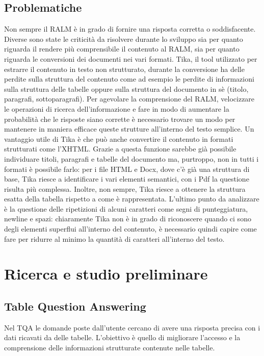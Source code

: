\subsection{Problematiche}
Non sempre il RALM è in grado di fornire una risposta corretta o soddisfacente.
Diverse sono state le criticità da risolvere durante lo sviluppo sia per quanto riguarda il rendere più comprensibile il contenuto al RALM, sia per quanto riguarda le conversioni dei documenti nei vari formati.
Tika, il tool utilizzato per estrarre il contenuto in testo non strutturato, durante la conversione ha delle perdite sulla struttura del contenuto come ad esempio le perdite di informazioni sulla struttura delle tabelle oppure sulla struttura del documento in sè (titolo, paragrafi, sottoparagrafi).
Per agevolare la comprensione del RALM, velocizzare le operazioni di ricerca dell'informazione e fare in modo di aumentare la probabilità che le risposte siano corrette è necessario trovare un modo per mantenere in maniera efficace queste strutture all'interno del testo semplice.
Un vantaggio utile di Tika è che può anche convertire il contenuto in formati strutturati come l'XHTML.
Grazie a questa funzione sarebbe già possibile individuare titoli, paragrafi e tabelle del documento ma, purtroppo, non in tutti i formati è possibile farlo: per i file HTML e Docx, dove c'è già una struttura di base, Tika riesce a identificare i vari elementi semantici, con i Pdf la questione risulta più complessa.
Inoltre, non sempre, Tika riesce a ottenere la struttura esatta della tabella rispetto a come è rappresentata.
L'ultimo punto da analizzare è la questione delle ripetizioni di alcuni caratteri come segni di punteggiatura, newline e spazi: chiaramente Tika non è in grado di riconoscere quando ci sono degli elementi superflui all'interno del contenuto, è necessario quindi capire come fare per ridurre al minimo la quantità di caratteri all'interno del testo. 


\section{Ricerca e studio preliminare}
\subsection{Table Question Answering}
Nel \gls{TQA} le domande poste dall'utente cercano di avere una risposta precisa con i dati ricavati da delle tabelle.
L'obiettivo è quello di migliorare l'accesso e la comprensione delle informazioni strutturate contenute nelle tabelle.

